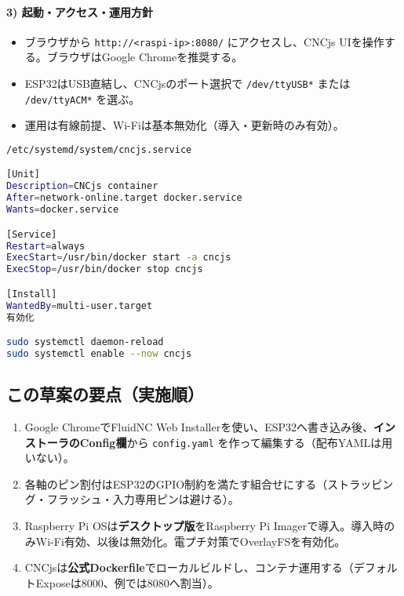 \documentclass[uplatex,dvipdfmx]{ujarticle}
\begin{document}
\paragraph{3) 起動・アクセス・運用方針}
\begin{itemize}
\item ブラウザから \texttt{http://<raspi-ip>:8080/} にアクセスし、CNCjs UIを操作する。ブラウザはGoogle Chromeを推奨する。
\item ESP32はUSB直結し、CNCjsのポート選択で \texttt{/dev/ttyUSB*} または \texttt{/dev/ttyACM*} を選ぶ。
\item 運用は有線前提、Wi-Fiは基本無効化（導入・更新時のみ有効）。
\end{itemize}

\begin{lstlisting}[caption=systemdで自動起動（コンテナを常駐させる例）, label=code:systemd, language=bash]
/etc/systemd/system/cncjs.service

[Unit]
Description=CNCjs container
After=network-online.target docker.service
Wants=docker.service

[Service]
Restart=always
ExecStart=/usr/bin/docker start -a cncjs
ExecStop=/usr/bin/docker stop cncjs

[Install]
WantedBy=multi-user.target
有効化

sudo systemctl daemon-reload
sudo systemctl enable --now cncjs
\end{lstlisting}

\subsection{この草案の要点（実施順）}
\begin{enumerate}
\item Google ChromeでFluidNC Web Installerを使い、ESP32へ書き込み後、\textbf{インストーラのConfig欄}から \texttt{config.yaml} を作って編集する（配布YAMLは用いない）。
\item 各軸のピン割付はESP32のGPIO制約を満たす組合せにする（ストラッピング・フラッシュ・入力専用ピンは避ける）。
\item Raspberry Pi OSは\textbf{デスクトップ版}をRaspberry Pi Imagerで導入。導入時のみWi-Fi有効、以後は無効化。電プチ対策でOverlayFSを有効化。
\item CNCjsは\textbf{公式Dockerfile}でローカルビルドし、コンテナ運用する（デフォルトExposeは8000、例では8080へ割当）。
\end{enumerate}
\end{document}
